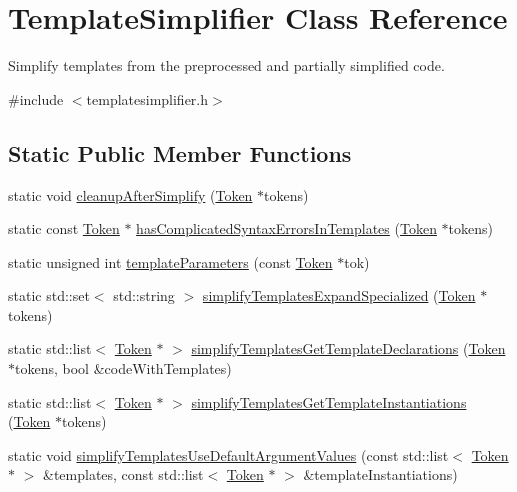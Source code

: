 \hypertarget{class_template_simplifier}{\section{Template\-Simplifier Class Reference}
\label{class_template_simplifier}
}


Simplify templates from the preprocessed and partially simplified code.  




{\ttfamily \#include $<$templatesimplifier.\-h$>$}

\subsection*{Static Public Member Functions}
\begin{DoxyCompactItemize}
\item 
static void \hyperlink{class_template_simplifier_ac01f95905486dd13583dd9b0fcbda66d}{cleanup\-After\-Simplify} (\hyperlink{class_token}{Token} $\ast$tokens)
\item 
static const \hyperlink{class_token}{Token} $\ast$ \hyperlink{class_template_simplifier_aafb5e2fe82fa8760250e4801b87e3260}{has\-Complicated\-Syntax\-Errors\-In\-Templates} (\hyperlink{class_token}{Token} $\ast$tokens)
\item 
static unsigned int \hyperlink{class_template_simplifier_ac2e88e20115cff2f804966b2922f6aeb}{template\-Parameters} (const \hyperlink{class_token}{Token} $\ast$tok)
\item 
static std\-::set$<$ std\-::string $>$ \hyperlink{class_template_simplifier_a03514dd02336f0ee0210b835f1aba50b}{simplify\-Templates\-Expand\-Specialized} (\hyperlink{class_token}{Token} $\ast$tokens)
\item 
static std\-::list$<$ \hyperlink{class_token}{Token} $\ast$ $>$ \hyperlink{class_template_simplifier_a2c73fc976e20811e63d69010e5b8e6dc}{simplify\-Templates\-Get\-Template\-Declarations} (\hyperlink{class_token}{Token} $\ast$tokens, bool \&code\-With\-Templates)
\item 
static std\-::list$<$ \hyperlink{class_token}{Token} $\ast$ $>$ \hyperlink{class_template_simplifier_a0b7e22b1885c069ac26b7cb8c39b4833}{simplify\-Templates\-Get\-Template\-Instantiations} (\hyperlink{class_token}{Token} $\ast$tokens)
\item 
static void \hyperlink{class_template_simplifier_a31b341ec2f4b101217b12948baf39745}{simplify\-Templates\-Use\-Default\-Argument\-Values} (const std\-::list$<$ \hyperlink{class_token}{Token} $\ast$ $>$ \&templates, const std\-::list$<$ \hyperlink{class_token}{Token} $\ast$ $>$ \&template\-Instantiations)

\end{DoxyCompactItemize}
